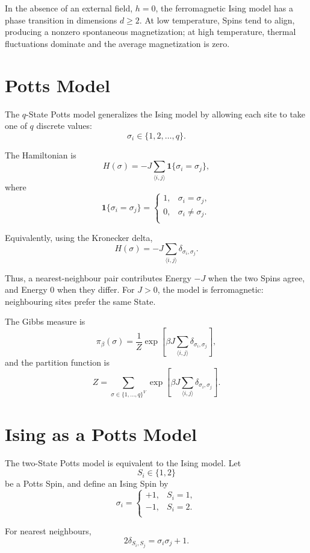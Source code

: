 \documentclass[a4paper, 10pt, onepage]{elegantbook}
\begin{document}
{In the absence of an external field, \(h=0\), the ferromagnetic Ising model has
a phase transition in dimensions \(d\ge2\). At low temperature, Spins tend to
align, producing a nonzero spontaneous magnetization; at high temperature,
thermal fluctuations dominate and the average magnetization is zero.

\section{Potts Model}

The \(q\)-State Potts model generalizes the Ising model by allowing each site
to take one of \(q\) discrete values:
\[
\sigma_i\in\{1,2,\ldots,q\}.
\]

The Hamiltonian is
\[
H(\sigma)
=
-J\sum_{\langle i,j\rangle}\mathbf 1\{\sigma_i=\sigma_j\},
\]
where
\[
\mathbf 1\{\sigma_i=\sigma_j\}
=
\begin{cases}
1, & \sigma_i=\sigma_j,  \\
0, & \sigma_i\ne\sigma_j. \\
\end{cases}
\]

Equivalently, using the Kronecker delta,
\[
H(\sigma)
=
-J\sum_{\langle i,j\rangle}\delta_{\sigma_i,\sigma_j}.
\]

Thus, a nearest-neighbour pair contributes Energy \(-J\) when the two Spins
agree, and Energy \(0\) when they differ. For \(J>0\), the model is
ferromagnetic: neighbouring sites prefer the same State.

The Gibbs measure is
\[
\pi_\beta(\sigma)
=
\frac{1}{Z}
\exp\left[
\beta J\sum_{\langle i,j\rangle}
\delta_{\sigma_i,\sigma_j}
\right],
\]
and the partition function is
\[
Z
=
\sum_{\sigma\in\{1,\ldots,q\}^V}
\exp\left[
\beta J\sum_{\langle i,j\rangle}
\delta_{\sigma_i,\sigma_j}
\right].
\]

\section{Ising as a Potts Model}

The two-State Potts model is equivalent to the Ising model. Let
\[
S_i\in\{1,2\}
\]
be a Potts Spin, and define an Ising Spin by
\[
\sigma_i=
\begin{cases}
+1, & S_i=1, \\
-1, & S_i=2. \\
\end{cases}
\]

For nearest neighbours,
\[
2\delta_{S_i,S_j}
=
\sigma_i\sigma_j+1.
\]

}
\end{document}
